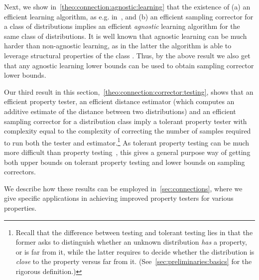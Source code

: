 Next, we show in~\cref{theo:connection:agnostic:learning} that the existence of \textsf{(a)} an efficient
learning algorithm, as e.g. in~\cite{ILR:12,CDSS:13,DDS:PBD:12,DDOST:13}, and \textsf{(b)} an efficient sampling
corrector for a class of distributions implies an efficient 
 \emph{agnostic} learning
algorithm for the same class of distributions.
It is well known that agnostic learning 
can be much harder than non-agnostic learning, 
as in the latter the algorithm is able to leverage structural properties of the class \class. Thus, by the above result we also get that any agnostic learning lower bounds can be used to obtain sampling corrector lower bounds.


Our third result in this section,~\cref{theo:connection:corrector:testing}, shows that an efficient property tester, 
an efficient distance estimator (which computes an additive estimate of the distance between two distributions) and an efficient sampling corrector for
a distribution class imply a tolerant property tester with complexity
equal to the complexity of correcting the number of samples required to run both the tester and estimator.\footnote{Recall that the difference between  testing and tolerant testing lies in that the former asks to distinguish whether an unknown distribution \emph{has} a property, or is far from it, while the latter requires to decide whether the distribution is \emph{close} to the property versus far from it. (See~\cref{sec:preliminaries:basics} for the rigorous definition.)}
As tolerant property testing can be much more difficult than
property testing~\cite{GRexp:00,BFRSW:10,Paninski:08,ValiantValiant:10lb}, this gives a general purpose way of getting
both upper bounds on tolerant property testing and lower bounds
on sampling correctors.\medskip

\noindent We describe how these results can be employed in~\cref{sec:connections}, where we give 
specific applications in achieving improved property testers for various properties.


